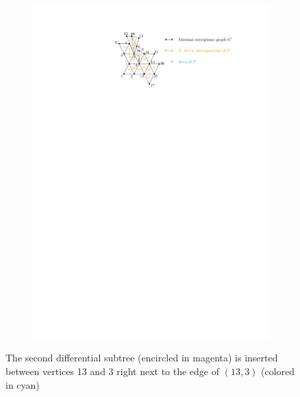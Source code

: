 \begin{figure}[H]
	\centering
	\begin{subfigure}{\textwidth}
		\centering
		\includegraphics[page=13,width=0.9\linewidth]{graphics/maximal_outerplanar_example_drawings.pdf}
	\end{subfigure}
	\caption{The second differential subtree (encircled in magenta) is inserted between vertices 13 and 3 right next to the edge of $(13,3)$ (colored in cyan)}
\end{figure}